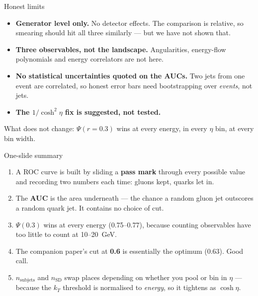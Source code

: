 \documentclass[aspectratio=169,10pt]{beamer}
\newcommand{\psic}[1]{\textcolor{psiblue}{#1}}
\newcommand{\sdc}[1]{\textcolor{sdorange}{#1}}
\newcommand{\sjc}[1]{\textcolor{sjgreen}{#1}}
\begin{document}
\begin{frame}{Honest limits}

\begin{itemize}
  \item \textbf{Generator level only.} No detector effects. The comparison is
        relative, so smearing should hit all three similarly --- but we have
        not shown that.
  \item \textbf{Three observables, not the landscape.} Angularities, energy-flow
        polynomials and energy correlators are not here.
  \item \textbf{No statistical uncertainties quoted on the AUCs.} Two jets from
        one event are correlated, so honest error bars need bootstrapping over
        \emph{events}, not jets.
  \item \textbf{The $1/\cosh^2\eta$ fix is suggested, not tested.}
\end{itemize}

\vspace{1.5em}
\centering
\large
What does not change: \psic{$\Psi(r=0.3)$} wins at every energy,
in every $\eta$ bin, at every bin width.

\end{frame}

\begin{frame}{One-slide summary}

\begin{enumerate}
  \item A ROC curve is built by sliding a \textbf{pass mark} through every
        possible value and recording two numbers each time: gluons kept,
        quarks let in.
  \vspace{0.4em}
  \item The \textbf{AUC} is the area underneath --- the chance a random gluon
        jet outscores a random quark jet. It contains no choice of cut.
  \vspace{0.4em}
  \item \psic{$\Psi(0.3)$} wins at every energy (0.75--0.77), because counting
        observables have too little to count at 10--20~GeV.
  \vspace{0.4em}
  \item The companion paper's cut at \textbf{0.6} is essentially the optimum
        (0.63). Good call.
  \vspace{0.4em}
  \item \sjc{$n_{\mathrm{subjets}}$} and \sdc{$n_{\mathrm{SD}}$} swap places
        depending on whether you pool or bin in $\eta$ ---
        because the $k_T$ threshold is normalised to \emph{energy}, so it
        tightens as $\cosh\eta$.
\end{enumerate}

\end{frame}
\end{document}
